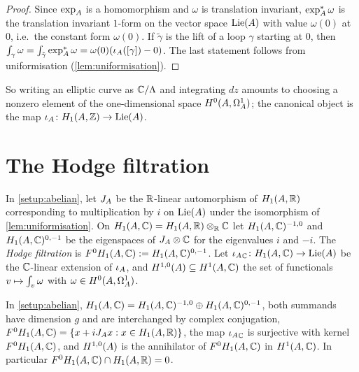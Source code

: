 \begin{proof}
Since $\exp_{A}$ is a homomorphism and $\omega$ is translation invariant,
$\exp_{A}^{*}\omega$ is the translation invariant $1$-form on the vector
space $\mathrm{Lie}(A)$ with value $\omega(0)$ at $0$, i.e.\ the constant form
$\omega(0)$. If $\tilde\gamma$ is the lift of a loop $\gamma$ starting at
$0$, then
$\int_{\gamma}\omega = \int_{\tilde\gamma}\exp_{A}^{*}\omega =
\omega(0)(\iota_{A}([\gamma]) - 0)$. The last statement follows
from uniformisation (\cref{lem:uniformisation}).
\end{proof}

\begin{remark}
So writing an elliptic curve as $\mathbb{C}/\Lambda$ and integrating $dz$ amounts
to choosing a nonzero element of the one-dimensional space
$H^{0}(A,\Omega^{1}_{A})$; the canonical object is the map
$\iota_{A} \colon H_{1}(A,\mathbb{Z}) \to \mathrm{Lie}(A)$.
\end{remark}

\section{The Hodge filtration}

\begin{definition}\label{def:hodge}
In \cref{setup:abelian}, let $J_{A}$ be the $\mathbb{R}$-linear
automorphism of $H_{1}(A,\mathbb{R})$ corresponding to multiplication by $i$
on $\mathrm{Lie}(A)$ under the isomorphism of \cref{lem:uniformisation}. On
$H_{1}(A,\mathbb{C}) = H_{1}(A,\mathbb{R})\otimes_{\mathbb{R}}\mathbb{C}$ let
$H_{1}(A,\mathbb{C})^{-1,0}$ and $H_{1}(A,\mathbb{C})^{0,-1}$ be the eigenspaces of
$J_{A}\otimes\mathbb{C}$ for the eigenvalues $i$ and $-i$. The
\emph{Hodge filtration} is $F^{0}H_{1}(A,\mathbb{C}) := H_{1}(A,\mathbb{C})^{0,-1}$.
Let ${\iota_{A}}_{\mathbb{C}} \colon H_{1}(A,\mathbb{C}) \to
\mathrm{Lie}(A)$ be the $\mathbb{C}$-linear extension of $\iota_{A}$, and
$H^{1,0}(A) \subseteq H^{1}(A,\mathbb{C})$ the set of functionals
$v \mapsto \int_{v}\omega$ with $\omega \in H^{0}(A,\Omega^{1}_{A})$.
\end{definition}

\begin{lemma}
\label{lem:hodge-kernel}
In \cref{setup:abelian},
$H_{1}(A,\mathbb{C}) = H_{1}(A,\mathbb{C})^{-1,0}\oplus H_{1}(A,\mathbb{C})^{0,-1}$, both
summands have dimension $g$ and are interchanged by complex conjugation,
$F^{0}H_{1}(A,\mathbb{C}) = \{x + iJ_{A}x : x \in H_{1}(A,\mathbb{R})\}$,
the map ${\iota_{A}}_{\mathbb{C}}$ is surjective with kernel
$F^{0}H_{1}(A,\mathbb{C})$, and $H^{1,0}(A)$ is the annihilator of
$F^{0}H_{1}(A,\mathbb{C})$ in $H^{1}(A,\mathbb{C})$. In particular
$F^{0}H_{1}(A,\mathbb{C}) \cap H_{1}(A,\mathbb{R}) = 0$.
\end{lemma}

